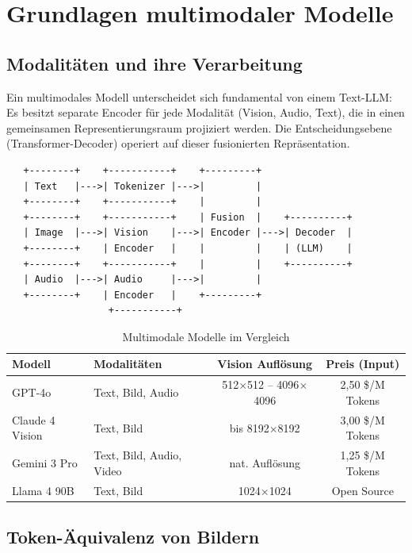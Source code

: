\section{Grundlagen multimodaler Modelle}

\subsection{Modalitäten und ihre Verarbeitung}

Ein multimodales Modell unterscheidet sich fundamental von einem Text-LLM: Es besitzt separate Encoder für jede Modalität (Vision, Audio, Text), die in einen gemeinsamen Representierungsraum projiziert werden. Die Entscheidungsebene (Transformer-Decoder) operiert auf dieser fusionierten Repräsentation.

\begin{verbatim}
   +--------+    +-----------+    +---------+
   | Text   |--->| Tokenizer |--->|         |
   +--------+    +-----------+    |         |
   +--------+    +-----------+    | Fusion  |    +----------+
   | Image  |--->| Vision    |--->| Encoder |--->| Decoder  |
   +--------+    | Encoder   |    |         |    | (LLM)    |
   +--------+    +-----------+    |         |    +----------+
   | Audio  |--->| Audio     |--->|         |
   +--------+    | Encoder   |    +---------+
                  +-----------+
\end{verbatim}

\begin{table}[H]
\centering
\begin{tabularx}{\linewidth}{lXcc}
\toprule
\textbf{Modell} & \textbf{Modalitäten} & \textbf{Vision Auflösung} & \textbf{Preis (Input)} \\
\midrule
GPT-4o & Text, Bild, Audio & 512$\times$512 -- 4096$\times$4096 & 2,50 \$/M Tokens \\
Claude 4 Vision & Text, Bild & bis 8192$\times$8192 & 3,00 \$/M Tokens \\
Gemini 3 Pro & Text, Bild, Audio, Video & nat. Auflösung & 1,25 \$/M Tokens \\
Llama 4 90B & Text, Bild & 1024$\times$1024 & Open Source \\
\bottomrule
\end{tabularx}
\caption{Multimodale Modelle im Vergleich}
\label{tab:multimodal-models}
\end{table}

\subsection{Token-Äquivalenz von Bildern}


